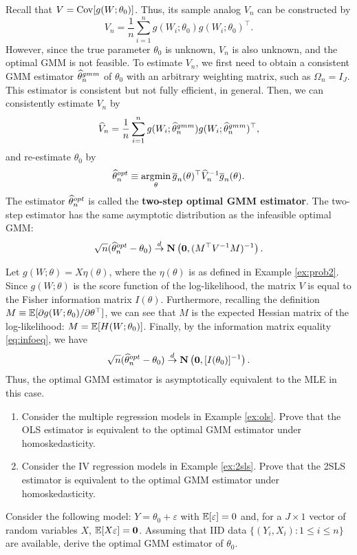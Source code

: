 \documentclass[11pt, A4paper, openany, uplatex]{book}
\begin{document}
Recall that $V = \mathrm{Cov}[g(W; \theta_0)]$.
Thus, its sample analog $V_n$ can be constructed by
\[
	V_n = \frac{1}{n} \sum_{i = 1}^n g(W_i; \theta_0)g(W_i; \theta_0)^\top.
\]
However, since the true parameter $\theta_0$ is unknown, $V_n$ is also unknown, and the optimal GMM is not feasible.
To estimate $V_n$, we first need to obtain a consistent GMM estimator $\widehat \theta_n^{gmm}$ of $\theta_0$ with an arbitrary weighting matrix, such as $\Omega_n = I_J$.
This estimator is consistent but not fully efficient, in general.
Then, we can consistently estimate $V_n$ by
\[
	\widehat V_n  = \frac{1}{n} \sum_{i = 1}^n g(W_i; \widehat \theta_n^{gmm})g(W_i; \widehat \theta_n^{gmm})^\top,
\]
and re-estimate $\theta_0$ by
\[
	\widehat \theta_n^{opt} \equiv \operatorname*{\arg\!\min}_{\theta} \overline{g}_n(\theta)^\top \widehat V_n^{-1} \overline{g}_n(\theta).
 \] 
 The estimator $\widehat \theta_n^{opt} $ is called the \textbf{two-step optimal GMM estimator}.
The two-step estimator has the same asymptotic distribution as the infeasible optimal GMM:
\[
	\sqrt{n} (\widehat \theta_n^{opt} - \theta_0)  \overset{d}{\to} \mathbf{N}\left(\mathbf{0},  (M^\top V^{-1} M )^{-1}  \right).
\]

\begin{example}\upshape
	Let $g(W; \theta) = X\eta(\theta)$, where the $\eta(\theta)$ is as defined in Example \ref{ex:prob2}.
	Since $g(W; \theta)$ is the score function of the log-likelihood, the matrix $V$ is equal to the Fisher information matrix $I(\theta)$.
	Furthermore, recalling the definition $M \equiv  \mathbb{E}[ \partial g(W; \theta_0) / \partial \theta^\top]$, we can see that $M$ is the expected Hessian matrix of the log-likelihood: $M = \mathbb{E}[H(W; \theta_0)]$.
	Finally, by the information matrix equality \eqref{eq:infoeq}, we have
	\[
	\sqrt{n} (\widehat \theta_n^{opt} - \theta_0)  \overset{d}{\to} \mathbf{N}\left(\mathbf{0}, [I(\theta_0)]^{-1}  \right).
	\]
	Thus, the optimal GMM estimator is asymptotically equivalent to the MLE in this case.
\end{example}

\begin{framed}
\begin{exercise}\upshape
	\begin{enumerate}
	\item Consider the multiple regression models in Example \ref{ex:ols}. 
	Prove that the OLS estimator is equivalent to the optimal GMM estimator under homoskedasticity.
	\item Consider the IV regression models in Example \ref{ex:2sls}.
	Prove that the 2SLS estimator is equivalent to the optimal GMM estimator under homoskedasticity.
	\end{enumerate}
\end{exercise}

\begin{exercise}\upshape
	Consider the following model: $Y = \theta_0 + \varepsilon$ with $\mathbb{E}[\varepsilon] = 0$ and, for a $J \times 1$ vector of random variables $X$, $\mathbb{E}[X \varepsilon] = \mathbf{0}$.
	Assuming that IID data $\{(Y_i,X_i): 1 \le i \le n\}$ are available, derive the optimal GMM estimator of $\theta_0$.
\end{exercise}
\end{framed}
\end{document}
